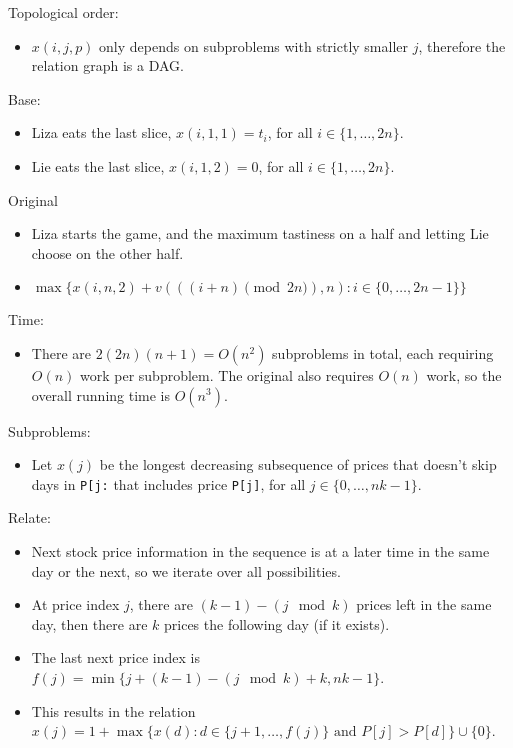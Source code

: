 \documentclass[12pt,twoside]{article}
\begin{document}
\begin{problems}
Topological order:
\begin{itemize}
    \item $x(i,j,p)$ only depends on subproblems with strictly smaller $j$, therefore the relation graph is a DAG.
\end{itemize}

Base:
\begin{itemize}
    \item Liza eats the last slice, $x(i,1,1)=t_i$, for all $i \in \{1,\ldots,2n\}$.
    \item Lie eats the last slice, $x(i,1,2)=0$, for all $i \in \{1,\ldots,2n\}$.
\end{itemize}

Original
\begin{itemize}
    \item Liza starts the game, and the maximum tastiness on a half and letting Lie choose on the other half.
    \item $\max\{x(i,n,2)+v(((i+n)\pmod {2n}),n):i \in \{0,\ldots,2n-1\}\}$
\end{itemize}

Time:
\begin{itemize}
    \item There are $2(2n)(n+1)=O(n^2)$ subproblems in total, each requiring $O(n)$ work per subproblem. The original also requires $O(n)$ work, so the overall running time is $O(n^3)$.
\end{itemize}

\newpage
\problem  %

Subproblems:
\begin{itemize}
    \item Let $x(j)$ be the longest decreasing subsequence of prices that doesn't skip days in \verb|P[j:| that includes price \verb|P[j]|, for all $j \in \{0,\ldots,nk-1\}$.
\end{itemize}

Relate:
\begin{itemize}
    \item Next stock price information in the sequence is at a later time in the same day or the next, so we iterate over all possibilities.
    \item At price index $j$, there are $(k-1)-(j \mod k)$ prices left in the same day, then there are $k$ prices the following day (if it exists).
    \item The last next price index is $f(j)=\min\{j+(k-1)-(j \mod k)+k,nk-1\}$.
    \item This results in the relation $x(j)=1+\max\{x(d):d\in\{j+1,\ldots,f(j)\} \text{ and } P[j]>P[d]\}\cup \{0\}$.
\end{itemize}


\end{problems}
\end{document}
